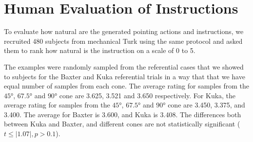 \section{Human Evaluation of Instructions}

To evaluate how natural are the generated pointing actions and instructions, we recruited 480 subjects from mechanical Turk using the same protocol and asked them to rank how natural is the instruction on a scale of 0 to 5. 


The examples were randomly sampled from the referential cases that we showed to subjects for the Baxter and Kuka referential trials in a way that that we have equal number of samples from each cone. The average rating for samples from the $\ang{45}$, $\ang{67.5}$ and $\ang{90}$ cone are 3.625, 3.521
and 3.650 respectively. For Kuka, the average rating for samples from the $\ang{45}$, $\ang{67.5}$ and $\ang{90}$ cone are 3.450, 3.375, and 3.400. The average for Baxter is 3.600, and Kuka is 3.408. The differences both between Kuka and Baxter, and different cones are not statistically significant ($t \leq |1.07|, p > 0.1 $).
